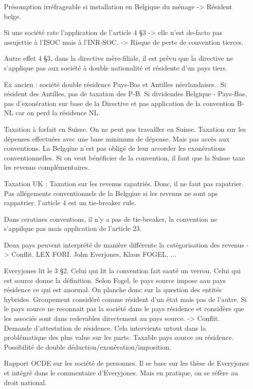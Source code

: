 \documentclass{book}
\begin{document}
Présomption irréfrageable si installation en Belgique du ménage -> Résident belge.

Si une société rate l’application de l’article 4 §3 -> elle n’est de-facto pas assujettie à l’ISOC mais à l’INR-SOC. -> Risque de perte de convention tierces.

Autre effet 4 §3, dans la directive mère-filiale, il est prévu que la directive ne s’applique pas aux société à double nationalité et résidente d’un pays tiers. 


Ex ancien : société double résidence Pays-Bas et Antilles néerlandaises.. Si résident des Antilles, pas de taxation des P-B. Si dividendes Belgique - Pays-Bas, pas d’exonération sur base de la Directive et pas application de la convention B- NL car on perd la résidence NL.

Taxation à forfait en Suisse. On ne peut pas travailler en Suisse. Taxation sur les dépenses effectuées avec une base minimum de dépense. Mais pas accès aux conventions. La Belgqiue n’est pas obligé de leur accorder les exonérations conventionnelles. Si on veut bénéficier de la convention, il faut que la Suisse taxe les revenus complémentaires.

Taxation UK : Taxation sur les revenus rapatriés. Donc, il ne faut pas rapatrier. Pas allégements conventionnels de la Belgqiue si les revenus ne sont aps rappatrier. l’article 4 est un tie-breaker rule.

Dans ceratines conventions, il n’y a pas de tie-breaker, la convention ne s’appilque pas mais application de l’article 23.

Deux pays peuvent interprété de manière différente la catégorisation des revenus -> Conflit. LEX FORI. John Everjones, Klaus FOGEL, ...

Everyjones lit le 3 §2. Celui qui lit la convention fait sauté un verrou. Celui qui est source donne la définition.
Selon Fogel, le pays source impose aau pays résidence ce qui est anormal. On planche donc sur la question des entités hybrides. Groupement considéré comme résident d’un état mais pas de l’autre. Si le pays source ne reconnait pas la société dans le pays résidence et considère que les associés sont dans redevables directement au pays source. -> Conflit. Demande d’attestation de résidence. Cela intervients urtout dans la problématique des plus value sur les parts. Taxable pays source ou résidence. Possibilité de double déduction/exonération/imposition.

Rapport OCDE sur les société de personnes. Il se base sur les thèse de Everyjones et intégré dans le commentaire d’Everyjones. Mais en pratique, on se réfère au droit national.
\end{document}
